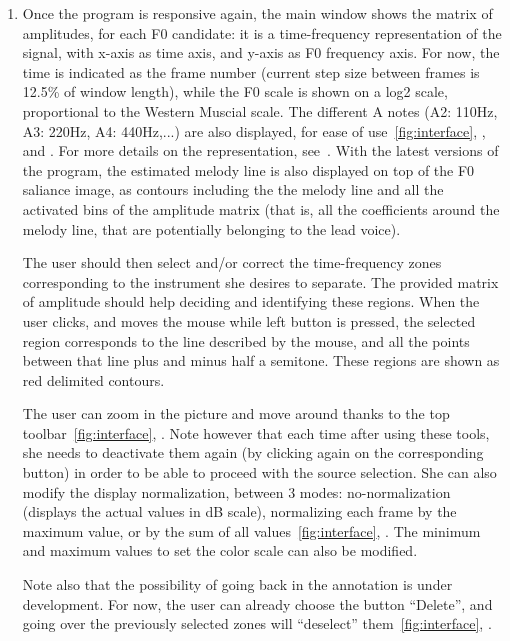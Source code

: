 \documentclass{article}
\newcommand\circled[1]{\raisebox{.5pt}{\textcircled{\raisebox{-.9pt} {#1}}}}
\begin{document}
\begin{enumerate}
\item Once the program is responsive again, the main window shows the matrix
   of amplitudes, for each F0 candidate: it is a time-frequency representation
   of the signal, with x-axis as time axis, and y-axis as F0 frequency axis.
   For now, the time is indicated as the frame number (current step size
   between frames is 12.5\% of window length), while the F0 scale is shown 
   on a log2 scale, proportional to the Western Muscial scale. The different
   A notes (A2: 110Hz, A3: 220Hz, A4: 440Hz,...) are also displayed, for
   ease of use~\ref{fig:interface}, \circled{4}, \circled{5} and \circled{7}. 
   For more details on the representation, see~\cite{Durrieu2011}.
   With the latest versions of the program, the estimated melody line is also
   displayed on top of the F0 saliance image, as contours including the 
   the melody line and all the activated bins of the amplitude matrix 
   (that is, all the coefficients around the melody line, that are 
   potentially belonging to the lead voice).
   
   The user should then select and/or correct the time-frequency zones 
   corresponding to
   the instrument she desires to separate. The provided matrix of amplitude
   should help deciding and identifying these regions. When the user clicks,
   and moves the mouse while left button is pressed, the selected region
   corresponds to the line described by the mouse, and all the points
   between that line plus and minus half a semitone. These regions are 
   shown as red delimited contours.
   
   The user can zoom in the picture and move around thanks to the top
   toolbar~\ref{fig:interface}, \circled{6}. Note however that each time after using these tools, she
   needs to deactivate them again (by clicking again on the corresponding
   button) in order to be able to proceed with the source selection.
   She can also modify the display normalization, between 3 modes: 
   no-normalization (displays the actual values in dB scale), normalizing
   each frame by the maximum value, or by the sum of all values~\ref{fig:interface}, \circled{8}. The minimum
   and maximum values to set the color scale can also be modified.
   
   Note also that the possibility of going back in the annotation is under
   development. For now, the user can already choose the button ``Delete'',
   and going over the previously selected zones will ``deselect'' them~\ref{fig:interface}, \circled{9}.
   

\end{enumerate}
\end{document}

